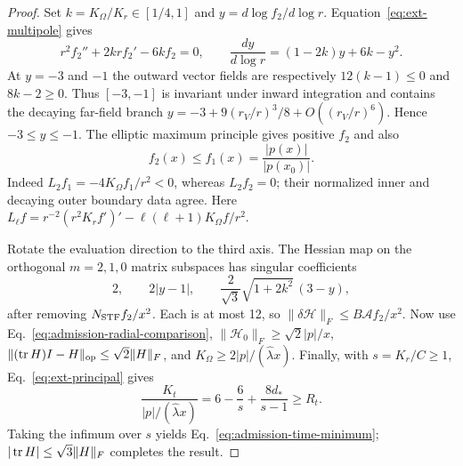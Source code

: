 \begin{proof}
Set $k=K_\Omega/K_r\in[1/4,1]$ and
$y=d\log f_2/d\log r$. Equation~\eqref{eq:ext-multipole} gives
\begin{equation}
 r^2f_2''+2krf_2'-6kf_2=0,\qquad
 \frac{dy}{d\log r}=(1-2k)y+6k-y^2.
\end{equation}
At $y=-3$ and $-1$ the outward vector fields are respectively
$12(k-1)\le0$ and $8k-2\ge0$. Thus $[-3,-1]$ is invariant under
inward integration and contains the decaying far-field branch
$y=-3+9(r_V/r)^3/8+O((r_V/r)^6)$. Hence $-3\le y\le-1$.
The elliptic maximum principle gives positive $f_2$ and also
\begin{equation}
 f_2(x)\le f_1(x)=\frac{|p(x)|}{|p(x_0)|}.
 \label{eq:admission-radial-comparison}
\end{equation}
Indeed $L_2f_1=-4K_\Omega f_1/r^2<0$, whereas $L_2f_2=0$;
their normalized inner and decaying outer boundary data agree. Here
$L_\ell f=r^{-2}(r^2K_rf')'-\ell(\ell+1)K_\Omega f/r^2$.

Rotate the evaluation direction to the third axis. The Hessian map on
the orthogonal $m=2,1,0$ matrix subspaces has singular coefficients
\begin{equation}
 2,\qquad 2|y-1|,\qquad
 \frac2{\sqrt3}\sqrt{1+2k^2}\,(3-y),
\end{equation}
after removing $N_{\rm STF}f_2/x^2$. Each is at most 12, so
$\|\delta\mathcal H\|_F\le B\mathcal A f_2/x^2$.
Now use Eq.~\eqref{eq:admission-radial-comparison},
$\|\mathcal H_0\|_F\ge\sqrt2|p|/x$,
$\|(\operatorname{tr} H)I-H\|_{\rm op}\le\sqrt2\|H\|_F$, and
$K_\Omega\ge2|p|/(\widehat\lambda x)$.
Finally, with $s=K_r/C\ge1$, Eq.~\eqref{eq:ext-principal} gives
\begin{equation}
 \frac{K_t}{|p|/(\widehat\lambda x)}
 =6-\frac6s+\frac{8d_*}{s-1}\ge R_t.
\end{equation}
Taking the infimum over $s$ yields Eq.~\eqref{eq:admission-time-minimum};
$|\operatorname{tr} H|\le\sqrt3\|H\|_F$ completes the result.
\end{proof}

